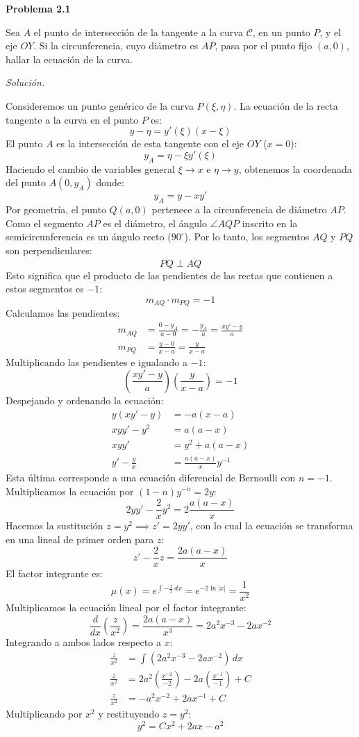 \documentclass[12pt,letterpaper]{article}
\begin{document}
\textbf{Problema 2.1}

\medskip
Sea $A$ el punto de intersección de la tangente a la curva $\mathcal{C}$, en un punto $P$, y el eje $OY$. Si la circunferencia, cuyo diámetro es $AP$, pasa por el punto fijo $(a, 0)$, hallar la ecuación de la curva.

\medskip
\textit{Solución.}

Consideremos un punto genérico de la curva $P(\xi, \eta)$. La ecuación de la recta tangente a la curva en el punto $P$ es:
\[
  y - \eta = y'(\xi)(x - \xi)
\]
El punto $A$ es la intersección de esta tangente con el eje $OY$ ($x = 0$):
\[
  y_A = \eta - \xi y'(\xi)
\]
Haciendo el cambio de variables general $\xi \to x$ e $\eta \to y$, obtenemos la coordenada del punto $A(0, y_A)$ donde:
\[
  y_A = y - x y'
\]
Por geometría, el punto $Q(a,0)$ pertenece a la circunferencia de diámetro $AP$. Como el segmento $AP$ es el diámetro, el ángulo $\angle AQP$ inscrito en la semicircunferencia es un ángulo recto ($90^\circ$). Por lo tanto, los segmentos $AQ$ y $PQ$ son perpendiculares:
\[
  \overline{PQ} \perp \overline{AQ}
\]
Esto significa que el producto de las pendientes de las rectas que contienen a estos segmentos es $-1$:
\[
  m_{AQ} \cdot m_{PQ} = -1
\]
Calculamos las pendientes:
\begin{align*}
  m_{AQ} &= \frac{0 - y_A}{a - 0} = -\frac{y_A}{a} = \frac{xy' - y}{a} \\
  m_{PQ} &= \frac{y - 0}{x - a} = \frac{y}{x - a}
\end{align*}
Multiplicando las pendientes e igualando a $-1$:
\[
  \left(\frac{xy' - y}{a}\right)\left(\frac{y}{x - a}\right) = -1
\]
Despejando y ordenando la ecuación:
\begin{align*}
  y(xy' - y) &= -a(x - a) \\
  xyy' - y^2 &= a(a - x) \\
  xyy' &= y^2 + a(a - x) \\
  y' - \frac{y}{x} &= \frac{a(a-x)}{x}y^{-1}
\end{align*}
Esta última corresponde a una ecuación diferencial de Bernoulli con $n = -1$. Multiplicamos la ecuación por $(1-n)y^{-n} = 2y$:
\[
  2yy' - \frac{2}{x}y^2 = 2\frac{a(a-x)}{x}
\]
Hacemos la sustitución $z = y^2 \implies z' = 2yy'$, con lo cual la ecuación se transforma en una lineal de primer orden para $z$:
\[
  z' - \frac{2}{x}z = \frac{2a(a-x)}{x}
\]
El factor integrante es:
\[
  \mu(x) = e^{\int -\frac{2}{x}\,dx} = e^{-2\ln|x|} = \frac{1}{x^2}
\]
Multiplicamos la ecuación lineal por el factor integrante:
\[
  \frac{d}{dx}\left(\frac{z}{x^2}\right) = \frac{2a(a-x)}{x^3} = 2a^2 x^{-3} - 2a x^{-2}
\]
Integrando a ambos lados respecto a $x$:
\begin{align*}
  \frac{z}{x^2} &= \int (2a^2 x^{-3} - 2a x^{-2})\,dx \\
  \frac{z}{x^2} &= 2a^2 \left(\frac{x^{-2}}{-2}\right) - 2a \left(\frac{x^{-1}}{-1}\right) + C \\
  \frac{z}{x^2} &= -a^2 x^{-2} + 2a x^{-1} + C
\end{align*}
Multiplicando por $x^2$ y restituyendo $z = y^2$:
\[
  y^2 = C x^2 + 2ax - a^2
\]
\end{document}
